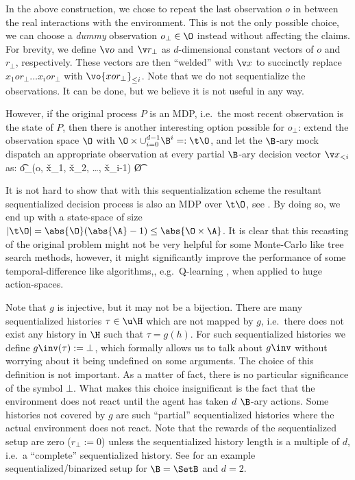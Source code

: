 \documentclass{article} %
\begin{document}
In the above construction, we chose to repeat the last observation $o$ in between the real interactions with the environment. This is not the only possible choice, we can choose a \emph{dummy} observation $o_\bot \in \O$ instead without affecting the claims. For brevity, we define $\v o$ and $\v r_\bot$ as $d$-dimensional constant vectors of $o$ and $r_\bot$, respectively. These vectors are then ``welded'' with $\v x$ to succinctly replace $x_1or_\bot\dots x_ior_\bot$ with $\vo{xor_\bot}_{\leq i}$. Note that we do not sequentialize the observations. It can be done, but we believe it is not useful in any way.

However, if the original process $P$ is an MDP, i.e.\ the most recent observation is the state of $P$, then there is another interesting option possible for $o_\bot$: extend the observation space $\O$ with $\O \times \cup_{i=0}^{d-1} \B^{i} =: \t \O$, and let the $\B$-ary mock dispatch an appropriate observation at every partial $\B$-ary decision vector $\v x_{<i}$ as:
\beq\label{eq:tobs}
\t o_\bot \coloneqq (o, \v x_1, \v x_2, \dots, \v x_{i-1}) \in \t \O
\eeq

It is not hard to show that with this sequentialization scheme the resultant sequentialized decision process is also an MDP over $\t \O$, see .
By doing so, we end up with a state-space of size $|\t \O| = \abs{\O}(\abs{\A}-1) \leq \abs{\O \times \A}$. It is clear that this recasting of the original problem might not be very helpful for some Monte-Carlo like tree search methods, however, it might significantly improve the performance of some temporal-difference like algorithms,, e.g.\ Q-learning \cite{Watkins1992}, when applied to huge action-spaces.

Note that $g$ is injective, but it may not be a bijection. There are many sequentialized histories $\tau \in \u \H$ which are not mapped by $g$, i.e.\ there does not exist any history in $\H$ such that $\tau = g(h)$. For such sequentialized histories we define $g\inv(\tau) := \bot$, which formally allows us to talk about $g\inv$ without worrying about it being undefined on some arguments. The choice of this definition is not important. As a matter of fact, there is no particular significance of the symbol $\bot$. What makes this choice insignificant is the fact that the environment does not react until the agent has taken $d$ $\B$-ary actions. Some histories not covered by $g$ are such ``partial'' sequentialized histories where the actual environment does not react. Note that the rewards of the sequentialized setup are zero ($r_\bot := 0$) unless the sequentialized history length is a multiple of $d$, i.e.\ a ``complete'' sequentialized history. See  for an example sequentialized/binarized setup for $\B = \SetB$ and $d=2$.
\end{document}
